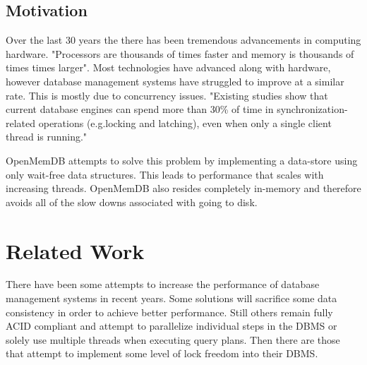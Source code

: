 \documentclass[letter,11pt]{article}
\begin{document}
\subsection{Motivation}
Over the last 30 years the there has been tremendous advancements in computing
hardware. "Processors are thousands of times faster and memory is thousands of
times times larger"\cite{stonebraker2007end}. Most technologies have advanced 
along with hardware, however database management systems have struggled to improve
at a similar rate. This is mostly due to concurrency issues. "Existing studies show
that current database engines can spend more than 30\% of time in 
synchronization-related operations (e.g.locking and latching), even when only a 
single client thread is running."\cite{soares2015database}
\par\vspace{\baselineskip}
OpenMemDB attempts to solve this problem by implementing a data-store using only wait-free data
structures. This leads to performance that scales with increasing threads. OpenMemDB also
resides completely in-memory and therefore avoids all of the slow downs associated with
going to disk.
\par\vspace{\baselineskip}

\section{Related Work}
There have been some attempts to increase the performance of database management
systems in recent years. Some solutions will sacrifice
some data consistency in order to achieve better performance. Still others
remain fully ACID compliant and attempt to parallelize individual steps in the 
DBMS or solely use multiple threads when executing query plans. Then there are those
that attempt to implement some level of lock freedom into their DBMS.
\par\vspace{\baselineskip}
\end{document}
